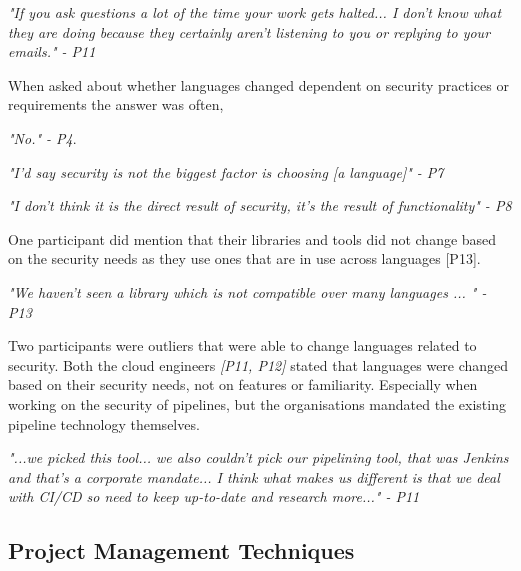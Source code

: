 \textit{"If you ask questions a lot of the time your work gets halted... I don't know what they are doing because they certainly aren't listening to you or replying to your emails." - P11}
\newline
\par
When asked about whether languages changed dependent on security practices or requirements the answer was often,
\newline
\par \textit{"No." - P4}.
\newline
\par 
\textit{"I'd say security is not the biggest factor is choosing [a language]" - P7 }
\newline
\par
\textit{"I don't think it is the direct result of security, it's the result of functionality" - P8}
\newline
\par One participant did mention that their libraries and tools did not change based on the security needs as they use ones that are in use across languages [P13].
\newline
\par
\textit{"We haven't seen a library which is not compatible over many languages ... " - P13}
\newline
\par Two participants were outliers that were able to change languages related to security. Both the cloud engineers \textit{[P11, P12]} stated that languages were changed based on their security needs, not on features or familiarity. Especially when working on the security of pipelines, but the organisations mandated the existing pipeline technology themselves. 
\newline
\par
\textit{"...we picked this tool... we also couldn't pick our pipelining tool, that was Jenkins and that's a corporate mandate... I think what makes us different is that we deal with CI/CD so need to keep up-to-date and research more..." - P11}

\subsection{Project Management Techniques}

